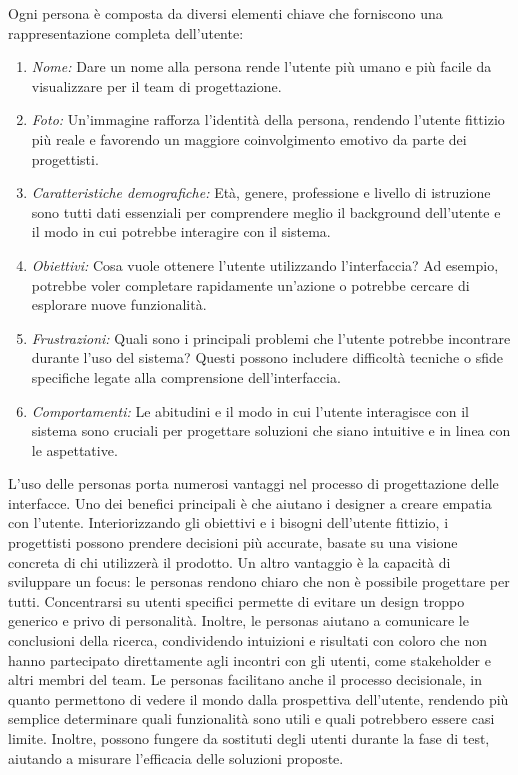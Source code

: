 Ogni persona è composta da diversi elementi chiave che forniscono una rappresentazione completa dell’utente:
\begin{enumerate}
    \item \textit{Nome:} Dare un nome alla persona rende l'utente più umano e più facile da visualizzare per il team di progettazione.
    \item \textit{Foto:} Un'immagine rafforza l'identità della persona, rendendo l'utente fittizio più reale e favorendo un maggiore coinvolgimento emotivo da parte dei progettisti.
    \item \textit{Caratteristiche demografiche:} Età, genere, professione e livello di istruzione sono tutti dati essenziali per comprendere meglio il background dell'utente e il modo in cui potrebbe interagire con il sistema.
    \item \textit{Obiettivi:} Cosa vuole ottenere l'utente utilizzando l'interfaccia? Ad esempio, potrebbe voler completare rapidamente un'azione o potrebbe cercare di esplorare nuove funzionalità.
    \item \textit{Frustrazioni:} Quali sono i principali problemi che l'utente potrebbe incontrare durante l'uso del sistema? Questi possono includere difficoltà tecniche o sfide specifiche legate alla comprensione dell'interfaccia.
    \item \textit{Comportamenti:} Le abitudini e il modo in cui l'utente interagisce con il sistema sono cruciali per progettare soluzioni che siano intuitive e in linea con le aspettative.
\end{enumerate}
L'uso delle personas porta numerosi vantaggi nel processo di progettazione delle interfacce. Uno dei benefici principali è che aiutano i designer a creare empatia con l'utente. Interiorizzando gli obiettivi e i bisogni dell'utente fittizio, i progettisti possono prendere decisioni più accurate, basate su una visione concreta di chi utilizzerà il prodotto.
Un altro vantaggio è la capacità di sviluppare un focus: le personas rendono chiaro che non è possibile progettare per tutti. Concentrarsi su utenti specifici permette di evitare un design troppo generico e privo di personalità. Inoltre, le personas aiutano a comunicare le conclusioni della ricerca, condividendo intuizioni e risultati con coloro che non hanno partecipato direttamente agli incontri con gli utenti, come stakeholder e altri membri del team.
Le personas facilitano anche il processo decisionale, in quanto permettono di vedere il mondo dalla prospettiva dell'utente, rendendo più semplice determinare quali funzionalità sono utili e quali potrebbero essere casi limite. Inoltre, possono fungere da sostituti degli utenti durante la fase di test, aiutando a misurare l'efficacia delle soluzioni proposte.

